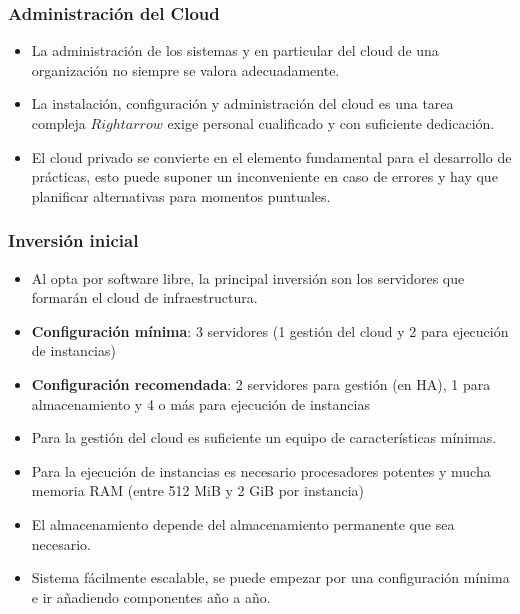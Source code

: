 \documentclass{beamer}
\begin{document}
\begin{frame}
  \frametitle{Administración del Cloud}
  \begin{itemize}
  \item La administración de los sistemas y en particular del cloud de
    una organización no siempre se valora adecuadamente.
  \item La instalación, configuración y administración del cloud es
    una tarea compleja $Rightarrow$ exige personal cualificado y con
    suficiente dedicación. 
  \item El cloud privado se convierte en el elemento fundamental para
    el desarrollo de prácticas, esto puede suponer un inconveniente en
    caso de errores y hay que planificar alternativas para momentos
    puntuales.
  \end{itemize}
\end{frame}

\begin{frame}
  \frametitle{Inversión inicial}
  \begin{itemize}
  \item Al opta por software libre, la principal inversión son los servidores
    que formarán el cloud de infraestructura.
  \item \textbf{Configuración mínima}: 3 servidores (1 gestión del cloud y 2 para
    ejecución de instancias)
  \item \textbf{Configuración recomendada}: 2 servidores para gestión (en HA), 1
    para almacenamiento y 4 o más para ejecución de instancias
  \item Para la gestión del cloud es suficiente un equipo de características
    mínimas.
  \item Para la ejecución de instancias es necesario procesadores potentes y
    mucha memoria RAM (entre 512 MiB y 2 GiB por instancia) 
  \item El almacenamiento depende del almacenamiento permanente que sea
    necesario.
  \item Sistema fácilmente escalable, se puede empezar por una
    configuración mínima e ir añadiendo componentes año a año.
  \end{itemize}
\end{frame}
\end{document}
